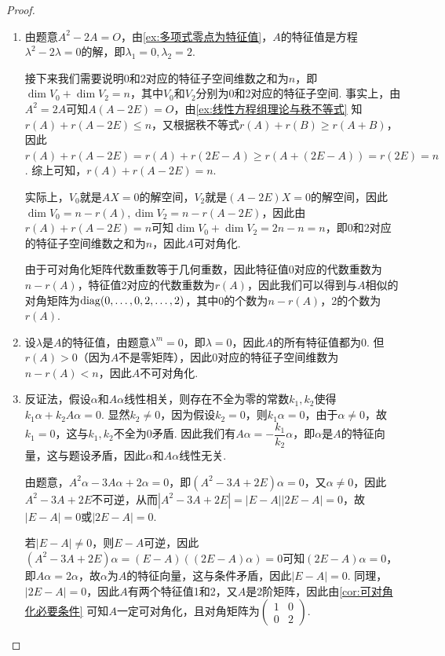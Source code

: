 \begin{proof}
    \begin{enumerate}
        \item 由题意$A^2-2A=O$，由\autoref{ex:多项式零点为特征值}，$A$的特征值是方程$\lambda^2-2\lambda=0$的解，即$\lambda_1=0,\lambda_2=2$.

              接下来我们需要说明0和2对应的特征子空间维数之和为$n$，即$\dim V_0+\dim V_2=n$，其中$V_0$和$V_2$分别为0和2对应的特征子空间. 事实上，由$A^2=2A$可知$A(A-2E)=O$，由\autoref{ex:线性方程组理论与秩不等式} 知$r(A)+r(A-2E)\leqslant n$，又根据秩不等式$r(A)+r(B)\geqslant r(A+B)$，因此$r(A)+r(A-2E)=r(A)+r(2E-A)\geqslant r(A+(2E-A))=r(2E)=n$. 综上可知，$r(A)+r(A-2E)=n$.

              实际上，$V_0$就是$AX=0$的解空间，$V_2$就是$(A-2E)X=0$的解空间，因此$\dim V_0=n-r(A),\dim V_2=n-r(A-2E)$，因此由$r(A)+r(A-2E)=n$可知$\dim V_0+\dim V_2=2n-n=n$，即0和2对应的特征子空间维数之和为$n$，因此$A$可对角化.

              由于可对角化矩阵代数重数等于几何重数，因此特征值0对应的代数重数为$n-r(A)$，特征值2对应的代数重数为$r(A)$，因此我们可以得到与$A$相似的对角矩阵为$\operatorname{diag}(0,\ldots,0,2,\ldots,2)$，其中0的个数为$n-r(A)$，2的个数为$r(A)$.

        \item 设$\lambda$是$A$的特征值，由题意$\lambda^m=0$，即$\lambda=0$，因此$A$的所有特征值都为0. 但$r(A)>0$（因为$A$不是零矩阵），因此0对应的特征子空间维数为$n-r(A)<n$，因此$A$不可对角化.

        \item 反证法，假设$\alpha$和$A\alpha$线性相关，则存在不全为零的常数$k_1,k_2$使得$k_1\alpha+k_2A\alpha=0$. 显然$k_2\neq 0$，因为假设$k_2=0$，则$k_1\alpha=0$，由于$\alpha\neq 0$，故$k_1=0$，这与$k_1,k_2$不全为0矛盾. 因此我们有$A\alpha=-\dfrac{k_1}{k_2}\alpha$，即$\alpha$是$A$的特征向量，这与题设矛盾，因此$\alpha$和$A\alpha$线性无关.

              由题意，$A^2\alpha-3A\alpha+2\alpha=0$，即$(A^2-3A+2E)\alpha=0$，又$\alpha\neq 0$，因此$A^2-3A+2E$不可逆，从而$|A^2-3A+2E|=|E-A||2E-A|=0$，故$|E-A|=0$或$|2E-A|=0$.

              若$|E-A|\neq 0$，则$E-A$可逆，因此$(A^2-3A+2E)\alpha=(E-A)((2E-A)\alpha)=0$可知$(2E-A)\alpha=0$，即$A\alpha=2\alpha$，故$\alpha$为$A$的特征向量，这与条件矛盾，因此$|E-A|=0$. 同理，$|2E-A|=0$，因此$A$有两个特征值1和2，又$A$是2阶矩阵，因此由\autoref{cor:可对角化必要条件} 可知$A$一定可对角化，且对角矩阵为$\begin{pmatrix}
                      1 & 0 \\
                      0 & 2
                  \end{pmatrix}$.
    \end{enumerate}
\end{proof}

